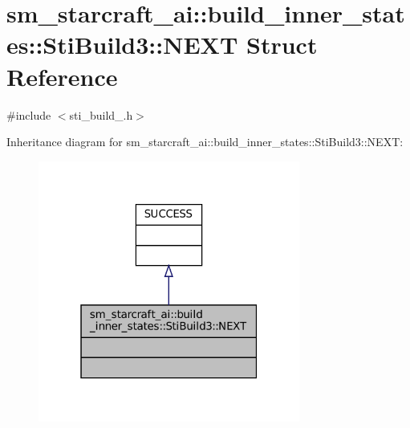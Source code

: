 \hypertarget{structsm__starcraft__ai_1_1build__inner__states_1_1StiBuild3_1_1NEXT}{}\section{sm\+\_\+starcraft\+\_\+ai\+:\+:build\+\_\+inner\+\_\+states\+:\+:Sti\+Build3\+:\+:N\+E\+XT Struct Reference}
\label{structsm__starcraft__ai_1_1build__inner__states_1_1StiBuild3_1_1NEXT}


{\ttfamily \#include $<$sti\+\_\+build\+\_.\+h$>$}



Inheritance diagram for sm\+\_\+starcraft\+\_\+ai\+:\+:build\+\_\+inner\+\_\+states\+:\+:Sti\+Build3\+:\+:N\+E\+XT\+:
\nopagebreak
\begin{figure}[H]
\begin{center}
\leavevmode
\includegraphics[width=244pt]{structsm__starcraft__ai_1_1build__inner__states_1_1StiBuild3_1_1NEXT__inherit__graph}
\end{center}
\end{figure}


